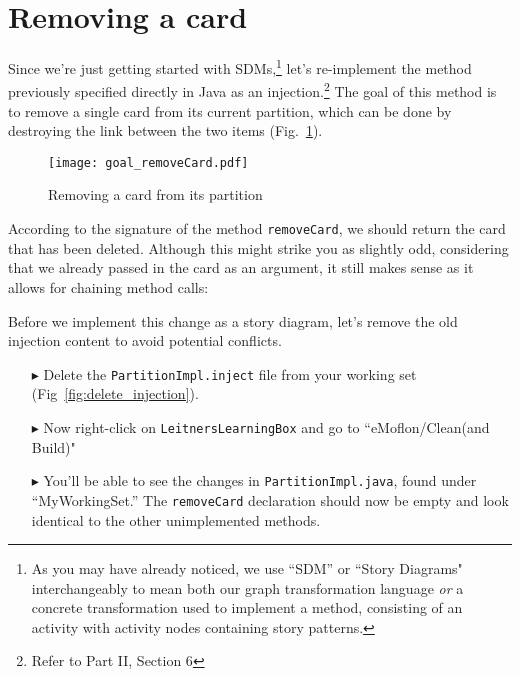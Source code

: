 \newpage
\genHeader
\section{Removing a card}
\hypertarget{sec:remCard}{}

Since we're just getting started with SDMs,\footnote{As you may have already noticed, we use ``SDM'' or ``Story Diagrams" interchangeably to mean both our graph
transformation language \emph{or} a concrete transformation used to implement a method, consisting of an activity with activity nodes containing story
patterns.} let's re-implement the method previously specified directly in Java as an injection.\footnote{Refer to Part II, Section 6} The goal of this method
is to remove a single card from its current partition, which can be done by destroying the link between the two items (Fig.~\ref{fig:goal_removeCard}).

\vspace{1cm}

\begin{figure}[htbp]
	\centering
    \texttt{[image: goal\_removeCard.pdf]}
	\caption{Removing a card from its partition}
	\label{fig:goal_removeCard}
\end{figure}
\FloatBarrier

\vspace{0.5cm}

According to the signature of the method \texttt{removeCard}, we should return the card that has been deleted. Although this might strike you as slightly odd,
considering that we already passed in the card as an argument, it still makes sense as it allows for chaining method calls:

Before we implement this change as a story diagram, let's remove the old injection content to avoid potential conflicts.

\begin{itemize}

\item[$\blacktriangleright$] Delete the \texttt{PartitionImpl.inject} file from your working set (Fig~\ref{fig:delete_injection}).

\item[$\blacktriangleright$] Now right-click on \texttt{LeitnersLearningBox} and go to ``eMoflon/Clean(and Build)" 

\item[$\blacktriangleright$] You'll be able to see the changes in \texttt{PartitionImpl.java}, found under ``MyWorkingSet.'' The \texttt{removeCard}
declaration should now be empty and look identical to the other unimplemented methods.

\end{itemize}

